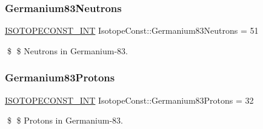 \subsubsection{\texorpdfstring{Germanium83\+Neutrons}{Germanium83Neutrons}}
{\footnotesize\ttfamily \mbox{\hyperlink{group___isotope_const-_macros_ga5f18360b3e99483a35c32d789e62621c}{I\+S\+O\+T\+O\+P\+E\+C\+O\+N\+S\+T\+\_\+\+I\+NT}} Isotope\+Const\+::\+Germanium83\+Neutrons = 51}

\$ \$ Neutrons in Germanium-\/83. \mbox{\label{group___isotope_const-_germanium-_ge83_gab6e629cea42b5d41be9fb61a7221b7bb}} 
\subsubsection{\texorpdfstring{Germanium83\+Protons}{Germanium83Protons}}
{\footnotesize\ttfamily \mbox{\hyperlink{group___isotope_const-_macros_ga5f18360b3e99483a35c32d789e62621c}{I\+S\+O\+T\+O\+P\+E\+C\+O\+N\+S\+T\+\_\+\+I\+NT}} Isotope\+Const\+::\+Germanium83\+Protons = 32}

\$ \$ Protons in Germanium-\/83. 